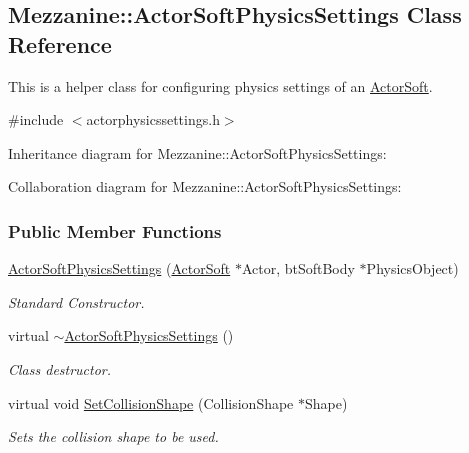 \hypertarget{classMezzanine_1_1ActorSoftPhysicsSettings}{\subsection{Mezzanine\-:\-:Actor\-Soft\-Physics\-Settings Class Reference}
\label{classMezzanine_1_1ActorSoftPhysicsSettings}
}


This is a helper class for configuring physics settings of an \hyperlink{classMezzanine_1_1ActorSoft}{Actor\-Soft}.  




{\ttfamily \#include $<$actorphysicssettings.\-h$>$}



Inheritance diagram for Mezzanine\-:\-:Actor\-Soft\-Physics\-Settings\-:


Collaboration diagram for Mezzanine\-:\-:Actor\-Soft\-Physics\-Settings\-:
\subsubsection*{Public Member Functions}
\begin{DoxyCompactItemize}
\item 
\hyperlink{classMezzanine_1_1ActorSoftPhysicsSettings_a1dbdd3a7b8af36cb8353a1af90102073}{Actor\-Soft\-Physics\-Settings} (\hyperlink{classMezzanine_1_1ActorSoft}{Actor\-Soft} $\ast$Actor, bt\-Soft\-Body $\ast$Physics\-Object)
\begin{DoxyCompactList}\small\item\em Standard Constructor. \end{DoxyCompactList}\item 
\hypertarget{classMezzanine_1_1ActorSoftPhysicsSettings_a9bd95e4279191ab50e5d60ad4ec07817}{virtual \hyperlink{classMezzanine_1_1ActorSoftPhysicsSettings_a9bd95e4279191ab50e5d60ad4ec07817}{$\sim$\-Actor\-Soft\-Physics\-Settings} ()}\label{classMezzanine_1_1ActorSoftPhysicsSettings_a9bd95e4279191ab50e5d60ad4ec07817}

\begin{DoxyCompactList}\small\item\em Class destructor. \end{DoxyCompactList}\item 
virtual void \hyperlink{classMezzanine_1_1ActorSoftPhysicsSettings_a4cbaf52fbdedf9c4e0328d3dd608207e}{Set\-Collision\-Shape} (Collision\-Shape $\ast$Shape)
\begin{DoxyCompactList}\small\item\em Sets the collision shape to be used. \end{DoxyCompactList}\end{DoxyCompactItemize}
